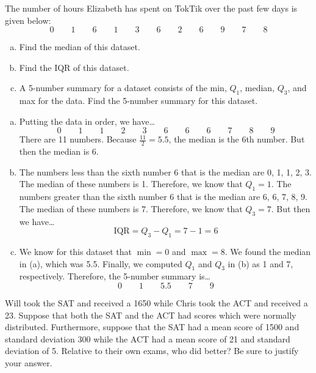 \documentclass[11pt,letterpaper]{article}
\begin{document}

 The number of hours Elizabeth has spent on TokTik over the past few days is given below:
	\[
	0 \qquad 1 \qquad 6 \qquad 1 \qquad 3 \qquad 6 \qquad 2 \qquad 6 \qquad 9 \qquad 7 \qquad 8  
	\] 

\begin{enumerate}[(a)]
\item Find the median of this dataset.
\item Find the IQR of this dataset. 
\item A 5-number summary for a dataset consists of the min, $Q_1$, median, $Q_3$, and max for the data. Find the 5-number summary for this dataset. 
\end{enumerate} \pspace

\sol 
\begin{enumerate}[(a)]
\item Putting the data in order, we have\dots
	\[
	0 \qquad 1 \qquad 1 \qquad 2 \qquad 3 \qquad 6 \qquad 6 \qquad 6 \qquad 7 \qquad 8 \qquad 9 
	\]
There are 11 numbers. Because $\frac{11}{2}= 5.5$, the median is the 6th number. But then the median is 6. \pspace

\item The numbers less than the sixth number 6 that is the median are 0, 1, 1, 2, 3. The median of these numbers is 1. Therefore, we know that $Q_1= 1$. The numbers greater than the sixth number 6 that is the median are 6, 6, 7, 8, 9. The median of these numbers is 7. Therefore, we know that $Q_3= 7$. But then we have\dots
	\[
	\text{IQR}= Q_3 - Q_1= 7 - 1= 6
	\] \pspace

\item We know for this dataset that $\min= 0$ and $\max= 8$. We found the median in (a), which was 5.5. Finally, we computed $Q_1$ and $Q_3$ in (b) as 1 and 7, respectively. Therefore, the 5-number summary is\dots
	\[
	0 \qquad 1 \qquad 5.5 \qquad 7 \qquad 9 
	\]
\end{enumerate}



\newpage



 Will took the SAT and received a 1650 while Chris took the ACT and received a 23. Suppose that both the SAT and the ACT had scores which were normally distributed. Furthermore, suppose that the SAT had a mean score of 1500 and standard deviation 300 while the ACT had a mean score of 21 and standard deviation of 5. Relative to their own exams, who did better? Be sure to justify your answer. \pspace
\end{document}
